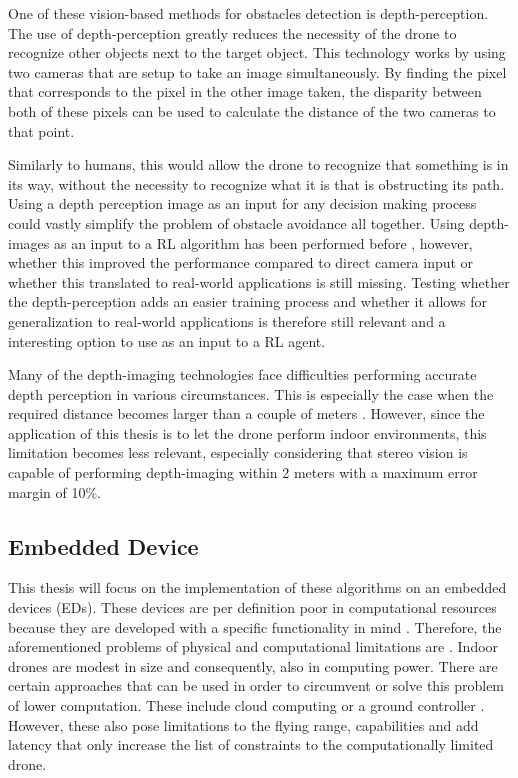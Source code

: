 One of these vision-based methods for obstacles detection is depth-perception.
The use of depth-perception greatly reduces the necessity of the drone to recognize 
other objects next to the target object. This technology works by using two
cameras that are setup to take an image simultaneously. By finding the pixel that 
corresponds to the pixel in the other image taken, the disparity between both of 
these pixels can be used to calculate the distance of the two cameras to that point.

Similarly to humans, this would allow the drone to recognize that something is in its way, 
without the necessity to recognize what it is that is obstructing its path. Using a 
depth perception image as an input for any decision making process could vastly simplify 
the problem of obstacle avoidance all together. 
Using depth-images as an input to a RL algorithm has been performed before \cite{iowamasterthesis},
however, whether this improved the performance compared to direct camera input or 
whether this translated to real-world applications is still missing. Testing whether 
the depth-perception adds an easier training process and whether it allows for generalization 
to real-world applications is therefore still relevant and a interesting option to use 
as an input to a RL agent. 

Many of the depth-imaging technologies face difficulties performing accurate 
depth perception in various circumstances. This is especially the case when the required distance becomes 
larger than a couple of meters \cite{stereovision}. However, since the application 
of this thesis is to let the drone perform indoor environments, this limitation 
becomes less relevant, especially considering that stereo vision is capable of performing
depth-imaging within 2 meters with a maximum error margin of 10\%. 

\subsection{Embedded Device}
This thesis will focus on the implementation
of these algorithms on an embedded devices (EDs). These devices are per definition poor in 
computational resources because they are developed with a specific functionality 
in mind \cite{embeddedsystem}. Therefore, the aforementioned problems of physical and 
computational limitations are . Indoor drones are modest in size and consequently, 
also in computing power. There are certain approaches that can be used in order to 
circumvent or solve this problem of lower computation. These include cloud computing or
a ground controller \cite{cloudcomputingdrone, ParrotARDrone}. However, these also 
pose limitations to the flying range, capabilities and add latency that only 
increase the list of constraints to the computationally limited drone. 

